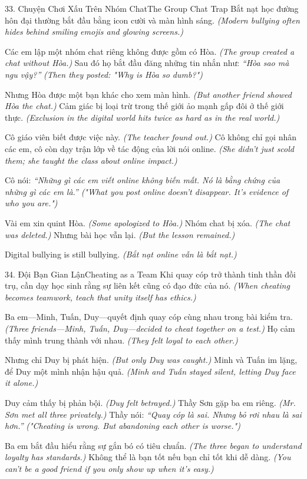 \begin{truyen}{33. Chuyện Chơi Xấu Trên Nhóm Chat}{The Group Chat Trap}
Bắt nạt học đường hôn đại thường bắt đầu bằng icon cười và màn hình sáng.
\textit{(Modern bullying often hides behind smiling emojis and glowing screens.)}

Các em lập một nhóm chat riêng không được gồm có Hòa.
\textit{(The group created a chat without Hòa.)}
Sau đó họ bắt đầu đăng những tin nhắn như: \textit{``Hòa sao mà ngu vậy?''}
\textit{(Then they posted: "Why is Hòa so dumb?")}

Nhưng Hòa được một bạn khác cho xem màn hình.
\textit{(But another friend showed Hòa the chat.)}
Cảm giác bị loại trừ trong thế giới ảo mạnh gấp đôi ở thế giới thực.
\textit{(Exclusion in the digital world hits twice as hard as in the real world.)}

Cô giáo viên biết được việc này.
\textit{(The teacher found out.)}
Cô không chỉ gọi nhân các em, cô còn dạy trận lớp về tác động của lời nói online.
\textit{(She didn't just scold them; she taught the class about online impact.)}

Cô nói: \textit{``Những gì các em viết online không biến mất. Nó là bằng chứng của những gì các em là.''}
\textit{("What you post online doesn't disappear. It's evidence of who you are.")}

Vài em xin quint Hòa.
\textit{(Some apologized to Hòa.)}
Nhóm chat bị xóa.
\textit{(The chat was deleted.)}
Nhưng bài học vẫn lại.
\textit{(But the lesson remained.)}
\end{truyen}

\begin{ghinhoanh}
Digital bullying is still bullying.
\textit{(Bắt nạt online vẫn là bắt nạt.)}
\end{ghinhoanh}

\begin{truyen}{34. Đội Bạn Gian Lận}{Cheating as a Team}
Khi quay cóp trở thành tinh thần đồi trụ, cần dạy học sinh rằng sự liên kết cũng có đạo đức của nó.
\textit{(When cheating becomes teamwork, teach that unity itself has ethics.)}

Ba em—Minh, Tuấn, Duy—quyết định quay cóp cùng nhau trong bài kiểm tra.
\textit{(Three friends—Minh, Tuấn, Duy—decided to cheat together on a test.)}
Họ cảm thấy mình trung thành với nhau.
\textit{(They felt loyal to each other.)}

Nhưng chỉ Duy bị phát hiện.
\textit{(But only Duy was caught.)}
Minh và Tuấn im lặng, để Duy một mình nhận hậu quả.
\textit{(Minh and Tuấn stayed silent, letting Duy face it alone.)}

Duy cảm thấy bị phản bội.
\textit{(Duy felt betrayed.)}
Thầy Sơn gặp ba em riêng.
\textit{(Mr. Sơn met all three privately.)}
Thầy nói: \textit{``Quay cóp là sai. Nhưng bỏ rơi nhau là sai hơn.''}
\textit{("Cheating is wrong. But abandoning each other is worse.")}

Ba em bắt đầu hiểu rằng sự gắn bó có tiêu chuẩn.
\textit{(The three began to understand loyalty has standards.)}
Không thể là bạn tốt nếu bạn chỉ tốt khi dễ dàng.
\textit{(You can't be a good friend if you only show up when it's easy.)}
\end{truyen}


